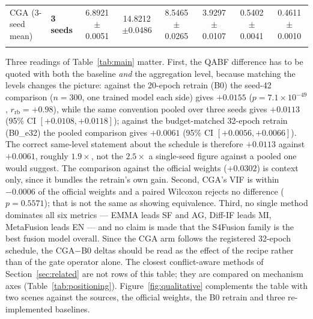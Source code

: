 \documentclass[pdflatex,sn-mathphys-num]{sn-jnl}
\theoremstyle{thmstyleone}%
\theoremstyle{thmstyletwo}%
\theoremstyle{thmstylethree}%
\begin{document}
\begin{table}[t]
{\begin{tabular}{@{}llcccccc@{}}
CGA (3-seed mean) & \textbf{3 seeds} & 6.8921$\pm$0.0051 & 14.8212$\pm$0.0486 & 8.5465$\pm$0.0265 & 3.9297$\pm$0.0107 & 0.5402$\pm$0.0041 & 0.4611$\pm$0.0010 \\
\botrule%
\end{tabular}}%
\end{table}

Three readings of Table~\ref{tab:main} matter. First, the QABF difference has to be quoted with both the baseline \emph{and} the aggregation level, because matching the levels changes the picture: against the 20-epoch retrain (B0) the seed-42 comparison ($n = 300$, one trained model each side) gives $+0.0155$ ($p = 7.1\times10^{-49}$, $r_{\mathrm{rb}} = +0.98$), while the same convention pooled over three seeds gives $+0.0113$ (95\% CI $[+0.0108, +0.0118]$); against the budget-matched 32-epoch retrain (B0\_e32) the pooled comparison gives $\mathbf{+0.0061}$ (95\% CI $[+0.0056, +0.0066]$). The correct same-level statement about the schedule is therefore $+0.0113$ against $+0.0061$, roughly $1.9\times$, not the $2.5\times$ a single-seed figure against a pooled one would suggest. The comparison against the official weights ($+0.0302$) is context only, since it bundles the retrain's own gain. Second, CGA's VIF is within $-0.0006$ of the official weights and a paired Wilcoxon rejects no difference ($p = 0.5571$); that is not the same as showing equivalence. Third, no single method dominates all six metrics --- EMMA leads SF and AG, Diff-IF leads MI, MetaFusion leads EN --- and no claim is made that the S4Fusion family is the best fusion model overall. Since the CGA arm follows the registered 32-epoch schedule, the CGA$-$B0 deltas should be read as the effect of the recipe rather than of the gate operator alone. The closest conflict-aware methods of Section~\ref{sec:related} are not rows of this table; they are compared on mechanism axes (Table~\ref{tab:positioning}). Figure~\ref{fig:qualitative} complements the table with two scenes against the sources, the official weights, the B0 retrain and three re-implemented baselines.
\end{document}
